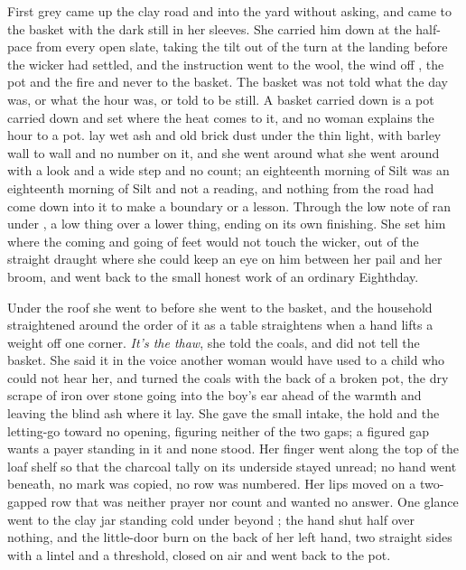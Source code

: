 First grey came up the clay road and into the yard without asking, and  came to the basket with the dark still in her sleeves. She carried him down  at the half-pace from every open slate, taking the tilt out of the turn at the landing before the wicker had settled, and the instruction went to the wool, the wind off , the pot and the fire and never to the basket. The basket was not told what the day was, or what the hour was, or told to be still. A basket carried down is a pot carried down and set where the heat comes to it, and no woman explains the hour to a pot.  lay wet ash and old brick dust under the thin light, with barley wall to wall and no number on it, and she went around what she went around with a look and a wide step and no count; an eighteenth morning of Silt was an eighteenth morning of Silt and not a reading, and nothing from the road had come down into it to make a boundary or a lesson. Through  the low note of  ran under , a low thing over a lower thing, ending on its own finishing. She set him where the coming and going of feet would not touch the wicker, out of the straight draught where she could keep an eye on him between her pail and her broom, and went back to the small honest work of an ordinary Eighthday.

Under the roof she went to  before she went to the basket, and the household straightened around the order of it as a table straightens when a hand lifts a weight off one corner. \emph{It's the thaw}, she told the coals, and did not tell the basket. She said it in the voice another woman would have used to a child who could not hear her, and turned the coals with the back of a broken pot, the dry scrape of iron over stone going into the boy's ear ahead of the warmth and leaving the blind ash where it lay. She gave the small intake, the hold and the letting-go toward no opening, figuring neither of the two gaps; a figured gap wants a payer standing in it and none stood. Her finger went along the top of the loaf shelf so that the charcoal tally on its underside stayed unread; no hand went beneath, no mark was copied, no row was numbered. Her lips moved on a two-gapped row that was neither prayer nor count and wanted no answer. One glance went to the clay jar standing cold under  beyond ; the hand shut half over nothing, and the little-door burn on the back of her left hand, two straight sides with a lintel and a threshold, closed on air and went back to the pot.

